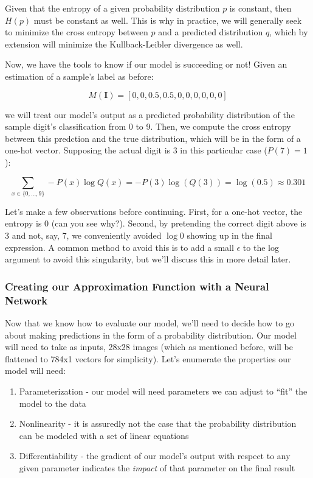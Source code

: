 \documentclass[
]{article}
\providecommand{\tightlist}{%
  \setlength{\itemsep}{0pt}\setlength{\parskip}{0pt}}
\begin{document}
Given that the entropy of a given probability distribution \(p\) is
constant, then \(H(p)\) must be constant as well. This is why in
practice, we will generally seek to minimize the cross entropy between
\(p\) and a predicted distribution \(q\), which by extension will
minimize the Kullback-Leibler divergence as well.

Now, we have the tools to know if our model is succeeding or not! Given
an estimation of a sample's label as before:

\[M(\mathbf{I}) = \left[0, 0, 0.5, 0.5, 0, 0, 0, 0, 0, 0\right]\]

we will treat our model's output as a predicted probability distribution
of the sample digit's classification from 0 to 9. Then, we compute the
cross entropy between this predction and the true distribution, which
will be in the form of a one-hot vector. Supposing the actual digit is 3
in this particular case (\(P(7) = 1\)):

\[ \sum_{x\in \{0,\dots, 9\}} -P(x) \log Q(x) = -P(3) \log(Q(3)) = \log(0.5) \approx 0.301 \]

Let's make a few observations before continuing. First, for a one-hot
vector, the entropy is 0 (can you see why?). Second, by pretending the
correct digit above is \(3\) and not, say, \(7\), we conveniently
avoided \(\log 0\) showing up in the final expression. A common method
to avoid this is to add a small \(\epsilon\) to the log argument to
avoid this singularity, but we'll discuss this in more detail later.

\hypertarget{creating-our-approximation-function-with-a-neural-network}{%
\subsubsection{Creating our Approximation Function with a Neural
Network}\label{creating-our-approximation-function-with-a-neural-network}}

Now that we know how to evaluate our model, we'll need to decide how to
go about making predictions in the form of a probability distribution.
Our model will need to take as inputs, 28x28 images (which as mentioned
before, will be flattened to 784x1 vectors for simplicity). Let's
enumerate the properties our model will need:

\begin{enumerate}
\def\labelenumi{\arabic{enumi}.}
\tightlist
\item
  Parameterization - our model will need parameters we can adjust to
  ``fit'' the model to the data
\item
  Nonlinearity - it is assuredly not the case that the probability
  distribution can be modeled with a set of linear equations
\item
  Differentiability - the gradient of our model's output with respect to
  any given parameter indicates the \emph{impact} of that parameter on
  the final result
\end{enumerate}
\end{document}
